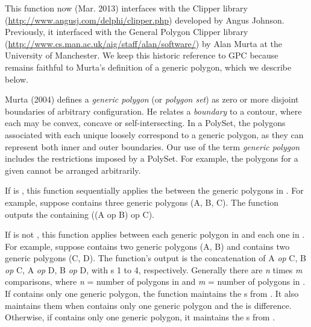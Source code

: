 \documentclass[letterpaper]{book}
\begin{document}
\begin{Details}\relax
This function now (Mar. 2013) interfaces with the Clipper library \\{}
(\url{http://www.angusj.com/delphi/clipper.php}) developed by Angus
Johnson.  Previously, it interfaced with the General Polygon Clipper
library \\{} (\url{http://www.cs.man.ac.uk/aig/staff/alan/software/}) by
Alan Murta at the University of Manchester.  We keep this historic
reference to GPC because  remains faithful to Murta's
definition of a generic polygon, which we describe below.

Murta (2004) defines a \emph{generic polygon} (or \emph{polygon set})
as zero or more disjoint boundaries of arbitrary configuration.  He
relates a \emph{boundary} to a contour, where each may be convex,
concave or self-intersecting. In a PolySet, the polygons associated
with each unique  loosely correspond to a generic polygon,
as they can represent both inner and outer boundaries.  Our use of the
term \emph{generic polygon} includes the restrictions imposed by a
PolySet.  For example, the polygons for a given  cannot
be arranged arbitrarily.

If  is , this function sequentially applies
the  between the generic polygons in .
For example, suppose  contains three generic polygons (A,
B, C).  The function outputs the  containing ((A op B)
op C).

If  is not , this function applies
 between each generic polygon in  and
each one in .  For example, suppose 
contains two generic polygons (A, B) and  contains two
generic polygons (C, D).  The function's output is the concatenation
of A \emph{op} C, B \emph{op} C, A \emph{op} D, B \emph{op} D, with
s 1 to 4, respectively.  Generally there are \emph{n}
times \emph{m} comparisons, where \emph{n} = number of polygons in
 and \emph{m} = number of polygons in .  If
 contains only one generic polygon, the function
maintains the s from .  It also maintains them
when  contains only one generic polygon and the
 is difference.  Otherwise, if  contains
only one generic polygon, it maintains the s from
.
\end{Details}
\end{document}
